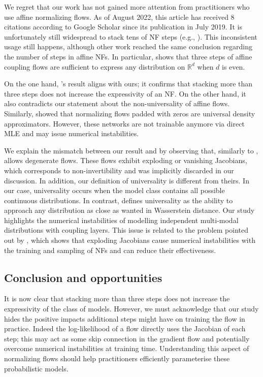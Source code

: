 We regret that our work has not gained more attention from practitioners who use affine normalizing flows. As of August 2022, this article has received $8$ citations according to Google Scholar since its publication in July 2019. It is unfortunately still widespread to stack tens of NF steps (e.g., \citep{daxamortized}). This inconsistent usage still happens, although other work reached the same conclusion regarding the number of steps in affine NFs. In particular, \citet{koehler2021representational} shows that three steps of affine coupling flows are sufficient to express any distribution on $\mathbb{R}^d$ when $d$ is even.

On the one hand, \citet{koehler2021representational}'s result aligns with ours; it confirms that stacking more than three steps does not increase the expressivity of an NF.
On the other hand, it also contradicts our statement about the non-universality of affine flows. Similarly, \citet{huang2020augmented} showed that normalizing flows padded with zeros are universal density approximators. However, these networks are not trainable anymore via direct MLE and may issue numerical instabilities.

We explain the mismatch between our result and \citet{koehler2021representational} by observing that, similarly to \citet{huang2020augmented}, \citet{koehler2021representational} allows degenerate flows. These flows exhibit exploding or vanishing Jacobians, which corresponds to non-invertibility and was implicitly discarded in our discussion. In addition, our definition of universality is different from theirs. In our case, universality occurs when the model class contains all possible continuous distributions. In contrast, \citet{koehler2021representational} defines universality as the ability to approach any distribution as close as wanted in Wasserstein distance. Our study highlights the numerical instabilities of modelling independent multi-modal distributions with coupling layers. This issue is related to the problem pointed out by \citet{behrmann2021understanding}, which shows that exploding Jacobians cause numerical instabilities with the training and sampling of NFs and can reduce their effectiveness.

\subsection{Conclusion and opportunities}
It is now clear that stacking more than three steps does not increase the expressivity of the class of models. However, we must acknowledge that our study hides the positive impacts additional steps might have on training the flow in practice. Indeed the log-likelihood of a flow directly uses the Jacobian of each step; this may act as some skip connection in the gradient flow and potentially overcome numerical instabilities at training time. Understanding this aspect of normalizing flows should help practitioners efficiently parameterise these probabilistic models.

